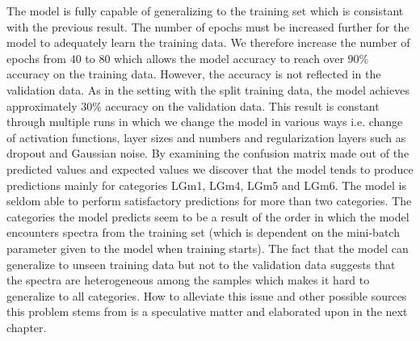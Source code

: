 The model is fully capable of generalizing to the training set which is consistant with the previous result. The number of epochs must be increased further for the model to adequately learn the training data. We therefore increase the number of epochs from $40$ to $80$ which allows the model accuracy to reach over $90\%$ accuracy on the training data. However, the accuracy is not reflected in the validation data. As in the setting with the split training data, the model achieves approximately $30\%$ accuracy on the validation data. This result is constant through multiple runs in which we change the model in various ways i.e. change of activation functions, layer sizes and numbers and regularization layers such as dropout and Gaussian noise. By examining the confusion matrix made out of the predicted values and expected values we discover that the model tends to produce predictions mainly for categories LGm1, LGm4, LGm5 and LGm6. The model is seldom able to perform satisfactory predictions for more than two categories. The categories the model predicts seem to be a result of the order in which the model encounters spectra from the training set (which is dependent on the mini-batch parameter given to the model when training starts). The fact that the model can generalize to unseen training data but not to the validation data suggests that the spectra are heterogeneous among the samples which makes it hard to generalize to all categories. How to alleviate this issue and other possible sources this problem stems from is a speculative matter and elaborated upon in the next chapter.

